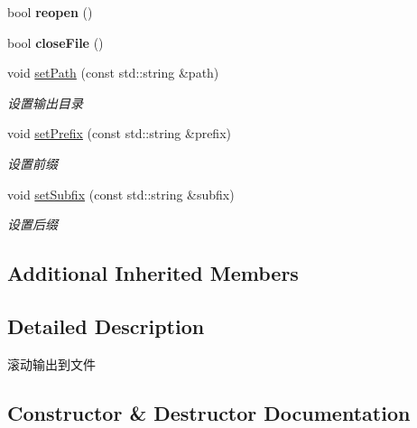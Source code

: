 \begin{DoxyCompactItemize}
bool {\bfseries reopen} ()
\item 
\mbox{\label{classdaq_1_1RollFileAppender_a3bc5fac1491f59f46c1fb5ea484ed1db}} 
bool {\bfseries close\+File} ()
\item 
void \hyperlink{classdaq_1_1RollFileAppender_ac58806a64d86b2b56fa778e4a3a3d667}{set\+Path} (const std\+::string \&path)
\begin{DoxyCompactList}\small\item\em 设置输出目录 \end{DoxyCompactList}\item 
void \hyperlink{classdaq_1_1RollFileAppender_a21da274c5787fc3b33e972bb90762d86}{set\+Prefix} (const std\+::string \&prefix)
\begin{DoxyCompactList}\small\item\em 设置前缀 \end{DoxyCompactList}\item 
void \hyperlink{classdaq_1_1RollFileAppender_a18c120a62efcc2e5924b7a6450171607}{set\+Subfix} (const std\+::string \&subfix)
\begin{DoxyCompactList}\small\item\em 设置后缀 \end{DoxyCompactList}\end{DoxyCompactItemize}
\subsection*{Additional Inherited Members}


\subsection{Detailed Description}
滚动输出到文件 

\subsection{Constructor \& Destructor Documentation}
\mbox{\label{classdaq_1_1RollFileAppender_aca76aebe714fc6c86e9392f3d9753306}} 
